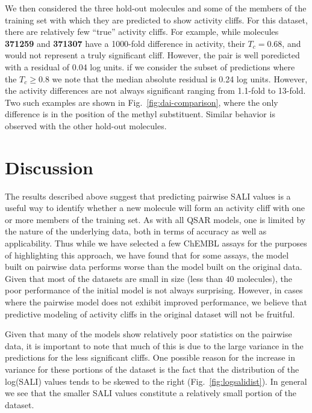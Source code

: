 \documentclass[letterpaper, 12pt]{article}
\begin{document}
We then considered the three hold-out molecules and some of the members
of the training set with which they are predicted to show activity
cliffs. For this dataset, there are relatively few ``true'' activity
cliffs. For example, while molecules
\textbf{371259} and \textbf{371307} have a 1000-fold difference in
activity, their $T_c = 0.68$, and would not represent a truly
significant cliff. However, the pair is well poredicted with a
residual of 0.04 log units. if we consider the subset of predictions
where the $T_c \geq 0.8$ we note that the median absolute residual is
0.24 log units. However, the activity differences are not always
significant ranging from 1.1-fold to 13-fold. Two such examples are shown
in Fig.~\ref{fig:dai-comparison}, where the only difference is in the
position of the methyl substituent. Similar behavior is observed with
the other hold-out molecules.  

\section{Discussion}
\label{sec:discussion}

The results described above suggest that predicting pairwise SALI
values is a useful way to identify whether a new molecule will
form an activity cliff with one or more members of the training
set. As with all QSAR models, one is limited by the nature of the
underlying data, both in terms of accuracy as well as
applicability. Thus while we have selected a few ChEMBL assays for the
purposes of highlighting this approach, we have found that for some
assays, the model built on pairwise data performs worse than the model
built on the original data. Given that most of the datasets are small
in size (less than 40 molecules), the poor performance of the initial
model is not always surprising. However, in cases where the pairwise
model does not exhibit improved performance, we believe that
predictive modeling of activity cliffs in the original dataset will
not be fruitful.

Given that many of the models show relatively poor statistics on the
pairwise data, it is important to note that much of this is due to the
large variance in the predictions for the less significant cliffs. One
possible reason for the increase in variance for these portions of the
dataset is the fact that the distribution of the log(SALI) values
tends to be skewed to the right (Fig.~\ref{fig:logsalidist}). In
general we see that the smaller SALI values constitute a relatively
small portion of the dataset.
\end{document}

